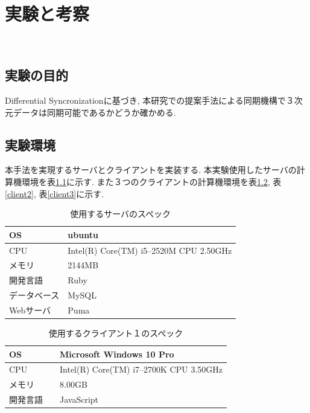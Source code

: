 \chapter{実験と考察}　\label{chap:test}

\section{実験の目的}
Differential Syncronizationに基づき, 本研究での提案手法による同期機構で３次元データは同期可能であるかどうか確かめる.
\section{実験環境}
本手法を実現するサーバとクライアントを実装する. 本実験使用したサーバの計算機環境を表\ref{server}に示す. また３つのクライアントの計算機環境を表\ref{client1}, 表\ref{client2}, 表\ref{client3}に示す.
\begin{table}[htbp]
\begin{center}
	\caption{使用するサーバのスペック}
	\begin{tabular}{|l|l|} \hline
		OS & ubuntu \\ \hline
		CPU &  Intel(R) Core(TM) i5--2520M CPU 2.50GHz\\ \hline
		メモリ & 2144MB \\ \hline
    開発言語　& Ruby \\ \hline
		データベース & MySQL \\ \hline
		Webサーバ & Puma\\ \hline
	\end{tabular}
	\label{server}
\end{center}
\end{table}

\begin{table}[htbp]
\begin{center}
	\caption{使用するクライアント１のスペック}
	\begin{tabular}{|l|l|} \hline
		OS & Microsoft Windows 10 Pro \\ \hline
		CPU & Intel(R) Core(TM) i7--2700K CPU 3.50GHz \\ \hline
		メモリ & 8.00GB \\ \hline
    開発言語　& JavaScript \\ \hline
	\end{tabular}
	\label{client1}
\end{center}
\end{table}

